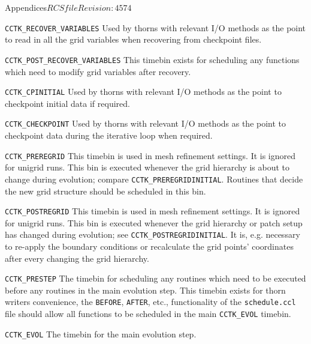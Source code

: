 \begin{cactuspart}{Appendices}{$RCSfile$}{$Revision: 4574 $}
\begin{Lentry}
\item[{\tt CCTK\_RECOVER\_VARIABLES}]
        Used by thorns with relevant I/O methods as the point 
        to read in all the grid variables when recovering from 
        checkpoint files.
        
\item[{\tt CCTK\_POST\_RECOVER\_VARIABLES}]
        This timebin exists for scheduling any functions which need 
        to modify grid variables after recovery.

\item[{\tt CCTK\_CPINITIAL}]
        Used by thorns with relevant I/O methods as the point to checkpoint
        initial data if required.

\item[{\tt CCTK\_CHECKPOINT}]
        Used by thorns with relevant I/O methods as the point to checkpoint
        data during the iterative loop when required.

\item[{\tt CCTK\_PREREGRID}]
        This timebin is used in mesh refinement settings.  It is
        ignored for unigrid runs.  This bin is executed whenever the
        grid hierarchy is about to change during evolution; compare
        {\tt CCTK\_PREREGRIDINITIAL}.  Routines that decide the
        new grid structure should be scheduled in this bin.

\item[{\tt CCTK\_POSTREGRID}]
        This timebin is used in mesh refinement settings.  It is
        ignored for unigrid runs.  This bin is executed whenever the
        grid hierarchy or patch setup has changed during evolution;
        see {\tt CCTK\_POSTREGRIDINITIAL}.  It is, e.g.
        necessary to re-apply the boundary conditions or recalculate
        the grid points' coordinates after every changing the grid
        hierarchy.
                
\item[{\tt CCTK\_PRESTEP}]
        The timebin for scheduling any routines which need to be 
        executed before any routines in the main evolution step. This 
        timebin exists for thorn writers convenience, the {\tt BEFORE}, 
        {\tt AFTER}, etc., functionality of the {\tt schedule.ccl} file
        should allow all functions to be scheduled in the main {\tt CCTK\_EVOL}
        timebin.
        
\item[{\tt CCTK\_EVOL}]
        The timebin for the main evolution step.
        

\end{Lentry}
\end{cactuspart}
